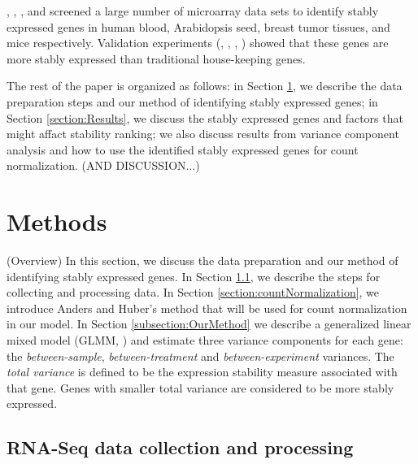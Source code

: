 \documentclass[11pt, a4paper]{article}
\begin{document}
\cite{stamova2009identification},  \citet{dekkers2012identification}, \citet{gur2009identification}, and
 \citet{frericks2008toolbox} screened a large number of microarray data sets
 to identify stably expressed genes in human blood, Arabidopsis seed, breast tumor tissues,
 and mice respectively.
Validation experiments (\cite{czechowski2005genome},
\cite{dekkers2012identification}, \cite{huggett2005real},
\cite{stamova2009identification}) showed that these genes are more stably
expressed than traditional house-keeping genes.  




The rest of the paper is organized as follows: in Section \ref{section:Methods}, we describe the data preparation steps and our method of identifying stably expressed genes; in Section \ref{section:Results}, we discuss the stably expressed genes and factors that might affact stability ranking; we also discuss results from variance component analysis and how to use the identified stably expressed genes for count normalization. (AND DISCUSSION...)


\section{Methods} \label{section:Methods}
(Overview) In this section, we discuss the data preparation and our method of
identifying stably expressed genes. In Section \ref{section:DataCollection},
we describe the steps for collecting and processing data. In Section
\ref{section:countNormalization}, we introduce Anders and Huber's method that
will be used for count normalization in our model. In Section
\ref{subsection:OurMethod}  we describe a generalized linear mixed model (GLMM, \citealt{mcculloch2001generalized}) and estimate three variance components for each gene: the \textit{between-sample}, \textit{between-treatment} and \textit{between-experiment} variances.
 The \textit{total variance} is defined to be the expression stability measure associated with that gene. Genes with smaller total variance are considered to be more stably expressed. 



\subsection{RNA-Seq data collection and processing}\label{section:DataCollection} 
\end{document}
